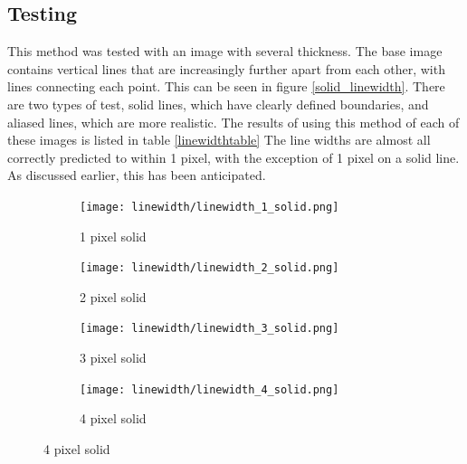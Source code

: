 \documentclass[../main.tex]{subfiles}
\begin{document}
    \subsection{Testing}
      This method was tested with an image with several thickness.
      The base image contains vertical lines that are increasingly further apart from each other, with lines connecting each point.
      This can be seen in figure \ref{solid_linewidth}.
      There are two types of test, solid lines, which have clearly defined boundaries, and aliased lines, which are more realistic.
      The results of using this method of each of these images is listed in table \ref{linewidthtable}
      The line widths are almost all correctly predicted to within 1 pixel, with the exception of 1 pixel on a solid line.
      As discussed earlier, this has been anticipated.
    \begin{figure}[H]
      \centering
      \begin{subfigure}[B]{0.19\textwidth}
        \centering
        \texttt{[image: linewidth/linewidth\_1\_solid.png]}
        \caption{1 pixel solid}
      \end{subfigure}
      \begin{subfigure}[B]{0.19\textwidth}
        \centering
        \texttt{[image: linewidth/linewidth\_2\_solid.png]}
        \caption{2 pixel solid}
      \end{subfigure}
       \begin{subfigure}[B]{0.19\textwidth}
        \centering
        \texttt{[image: linewidth/linewidth\_3\_solid.png]}
        \caption{3 pixel solid}
      \end{subfigure}
     \begin{subfigure}[B]{0.19\textwidth}
        \centering
        \texttt{[image: linewidth/linewidth\_4\_solid.png]}
        \caption{4 pixel solid}
      \end{subfigure}


\end{figure}
\end{document}
